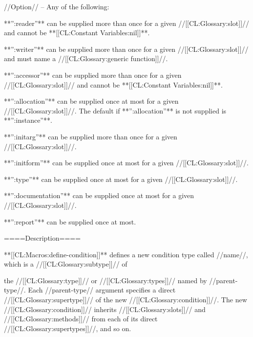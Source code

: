 //Option// -- Any of the following:

\beginlist


**'':reader''** can be supplied more than once for a given //[[CL:Glossary:slot]]// and cannot be **[[CL:Constant Variables:nil]]**.


**'':writer''** can be supplied more than once for a given //[[CL:Glossary:slot]]// and must name a //[[CL:Glossary:generic function]]//.


**'':accessor''** can be supplied more than once for a given //[[CL:Glossary:slot]]// and cannot be **[[CL:Constant Variables:nil]]**.


**'':allocation''** can be supplied once at most for a given //[[CL:Glossary:slot]]//. The default if **'':allocation''** is not supplied is **'':instance''**.


**'':initarg''** can be supplied more than once for a given //[[CL:Glossary:slot]]//.


**'':initform''** can be supplied once at most for a given //[[CL:Glossary:slot]]//.


**'':type''** can be supplied once at most for a given //[[CL:Glossary:slot]]//.


**'':documentation''** can be supplied once at most for a given //[[CL:Glossary:slot]]//.


**'':report''** can be supplied once at most.

\endlist

====Description====

**[[CL:Macros:define-condition]]** defines a new condition type called //name//, which is a //[[CL:Glossary:subtype]]// of

the //[[CL:Glossary:type]]// or //[[CL:Glossary:types]]// named by //parent-type//. Each //parent-type// argument specifies a direct //[[CL:Glossary:supertype]]// of the new //[[CL:Glossary:condition]]//. The new //[[CL:Glossary:condition]]// inherits //[[CL:Glossary:slots]]// and //[[CL:Glossary:methods]]// from each of its direct //[[CL:Glossary:supertypes]]//, and so on.

